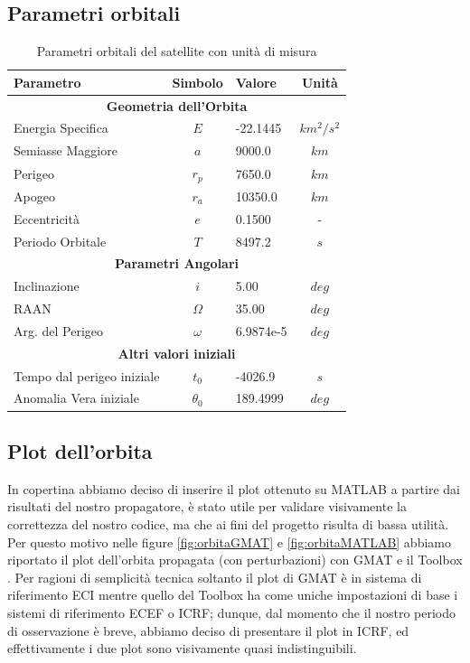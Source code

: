 \documentclass[12pt, a4paper]{article}
\begin{document}
\subsection{Parametri orbitali}

\begin{table}[h]
\centering
\begin{tabular}{|l|c|l|c|}
\hline
\textbf{Parametro} & \textbf{Simbolo} & \textbf{Valore} & \textbf{Unità} \\ \hline
\hline
\multicolumn{4}{|c|}{\textbf{Geometria dell'Orbita}} \\ \hline
Energia Specifica & $E$ & -22.1445 & $km^2/s^2$ \\ \hline
Semiasse Maggiore & $a$ & 9000.0 & $km$ \\ \hline
Perigeo& $r_p$ & 7650.0 & $km$ \\ \hline
Apogeo & $r_a$ & 10350.0 & $km$ \\ \hline
Eccentricità & $e$ & 0.1500 &  - \\ \hline
Periodo Orbitale & $T$ & 8497.2 & $s$ \\ \hline
\hline
\multicolumn{4}{|c|}{\textbf{Parametri Angolari}} \\ \hline
Inclinazione & $i$ & 5.00 & $deg$ \\ \hline
RAAN & $\Omega$ & 35.00 & $deg$ \\ \hline
Arg. del Perigeo & $\omega$ & 6.9874e-5 & $deg$ \\ \hline
\hline
\multicolumn{4}{|c|}{\textbf{Altri valori iniziali}} \\ \hline
Tempo dal perigeo iniziale  & $t_0$ & -4026.9 & $s$ \\ \hline
Anomalia Vera iniziale & $\theta_0$ & 189.4999 & $deg$ \\ \hline
\end{tabular}

\caption{Parametri orbitali del satellite con unità di misura}
\end{table}

\subsection{Plot dell'orbita} 
\label{sec:sezioneOrbita}
In copertina abbiamo deciso di inserire il plot ottenuto su MATLAB a partire dai risultati del nostro propagatore, è stato utile per validare visivamente la correttezza del nostro codice, ma che ai fini del progetto risulta di bassa utilità. Per questo motivo nelle figure \ref{fig:orbitaGMAT} e \ref{fig:orbitaMATLAB} abbiamo riportato il plot dell'orbita propagata (con perturbazioni) con GMAT e il Toolbox \cite{AerospaceToolbox}. Per ragioni di semplicità tecnica soltanto il plot di GMAT è in sistema di riferimento ECI mentre quello del Toolbox ha come uniche impostazioni di base i sistemi di riferimento ECEF o ICRF; dunque, dal momento che il nostro periodo di osservazione è breve, abbiamo deciso di presentare il plot in ICRF, ed effettivamente i due plot sono visivamente quasi indistinguibili.
\end{document}
